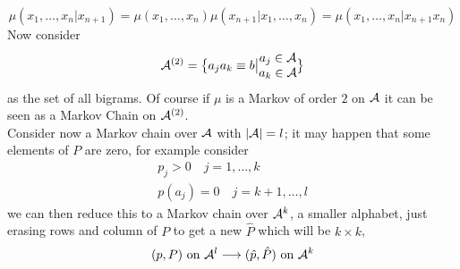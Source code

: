 \begin{equation*}
    \mu (x_1, \dots, x_n \big| x_{n+1}) = \mu (x_1, \dots, x_n) \mu (x_{n+1} \big| x_1, \dots, x_n) = \mu (x_1, \dots, x_n \big| x_{n+1}x_n)
\end{equation*}
Now consider 
\begin{equation*}
    \mathcal{A}^{(2)} = \big\{ a_ja_k \equiv b \big| 
    \begin{matrix}
        a_j \in \mathcal{A} \\
        a_k \in \mathcal{A}
    \end{matrix}
    \big\}
\end{equation*}
as the set of all bigrams. Of course if $\mu$ is a Markov of order $2$ on $\mathcal{A}$ it can be seen as a Markov Chain on $\mathcal{A}^{(2)}$.
\\Consider now a Markov chain over $\mathcal{A}$ with $|\mathcal{A}| = l$; it may happen that some elements of $P$ are zero, for example consider
\begin{gather*}
    p_j > 0 \quad j=1, \dots, k \\
    p(a_j) = 0 \quad j=k+1, \dots, l
\end{gather*}
we can then reduce this to a Markov chain over $\mathcal{A}^k$, a smaller alphabet, just erasing rows and column of $P$ to get a new $\hat{P}$ which will be $k \times k$, 
\begin{equation*}
    (p,P) \, \, \text{on} \, \, \mathcal{A}^l \longrightarrow (\hat{p},\hat{P}) \,\, \text{on} \,\, \mathcal{A}^k
\end{equation*}

